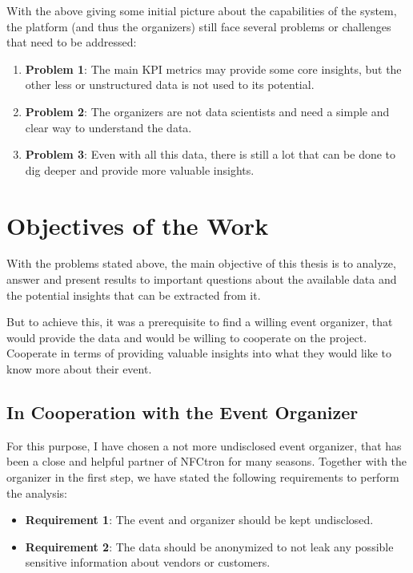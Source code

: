 With the above giving some initial picture about the capabilities of the system, the platform (and thus the organizers) still face several problems or challenges that need to be addressed:
\begin{enumerate}
	\item \textbf{Problem 1}: The main KPI metrics may provide some core insights, but the other less or unstructured data is not used to its potential.
	\item \textbf{Problem 2}: The organizers are not data scientists and need a simple and clear way to understand the data.
	\item \textbf{Problem 3}: Even with all this data, there is still a lot that can be done to dig deeper and provide more valuable insights.
\end{enumerate}

\section*{Objectives of the Work}
\label{sec:introduction-objectives}
With the problems stated above, the main objective of this thesis is to analyze, answer and present results to important questions about the available data and the potential insights that can be extracted from it.

But to achieve this, it was a prerequisite to find a willing event organizer, that would provide the data and would be willing to cooperate on the project.
Cooperate in terms of providing valuable insights into what they would like to know more about their event.

\subsection*{In Cooperation with the Event Organizer}
\label{subsec:introduction-objectives-cooperation}
For this purpose, I have chosen a not more undisclosed event organizer, that has been a close and helpful partner of NFCtron for many seasons.
Together with the organizer in the first step, we have stated the following requirements to perform the analysis:
\begin{itemize}
	\item \textbf{Requirement 1}: The event and organizer should be kept undisclosed.
	\item \textbf{Requirement 2}: The data should be anonymized to not leak any possible sensitive information about vendors or customers.
\end{itemize}

